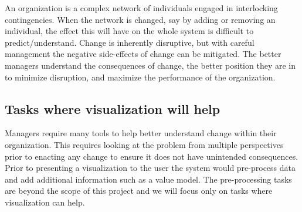 \documentclass[12pt,letterpaper]{article}
\begin{document}
An organization is a complex network of individuals engaged in interlocking contingencies\cite{glenn2006complexity}. When the network is changed, say by adding or removing an individual, the effect this will have on the whole system is difficult to predict/understand. Change is inherently disruptive, but with careful management the negative side-effects of change can be mitigated. The better managers understand the consequences of change, the better position they are in to minimize disruption, and maximize the performance of the organization. 

\subsection{Tasks where visualization will help}

Managers require many tools to help better understand change within their organization.  This requires looking at the problem from multiple perspectives prior to enacting any change to ensure it does not have unintended consequences.  Prior to presenting a visualization to the user the system would pre-process data and add additional information such as a value model.  The pre-processing tasks are beyond the scope of this project and we will focus only on tasks where visualization can help.
\end{document}
